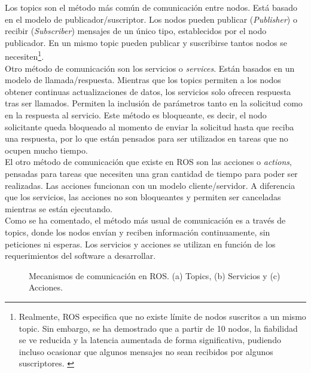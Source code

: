 Los topics son el método más común de comunicación entre nodos. Está basado en el modelo de publicador/suscriptor. Los nodos pueden publicar (\textit{Publisher}) o recibir (\textit{Subscriber}) mensajes de un único tipo, establecidos por el nodo publicador. En un mismo topic pueden publicar y suscribirse tantos nodos se necesiten\footnote{Realmente, ROS especifica que no existe límite de nodos suscritos a un mismo topic. Sin embargo, se ha demostrado que a partir de 10 nodos, la fiabilidad se ve reducida y la latencia aumentada de forma significativa, pudiendo incluso ocasionar que algunos mensajes no sean recibidos por algunos suscriptores. \cite{issue}}. \\

Otro método de comunicación son los servicios o \textit{services}. Están basados en un modelo de llamada/respuesta. Mientras que los topics permiten a los nodos obtener continuas actualizaciones de datos, los servicios solo ofrecen respuesta tras ser llamados. Permiten la inclusión de parámetros tanto en la solicitud como en la respuesta al servicio. Este método es bloqueante, es decir, el nodo solicitante queda bloqueado al momento de enviar la solicitud hasta que reciba una respuesta, por lo que están pensados para ser utilizados en tareas que no ocupen mucho tiempo.\\

El otro método de comunicación que existe en ROS son las acciones o \textit{actions}, pensadas para tareas que necesiten una gran cantidad de tiempo para poder ser realizadas. Las acciones funcionan con un modelo cliente/servidor. A diferencia que los servicios, las acciones no son bloqueantes y permiten ser canceladas mientras se están ejecutando.\\

Como se ha comentado, el método más usual de comunicación es a través de topics, donde los nodos envían y reciben información continuamente, sin peticiones ni esperas. Los servicios y acciones se utilizan en función de los requerimientos del software a desarrollar.\\

\begin{figure}[H]
 \centering
  \hspace{0.5cm}
 \caption{Mecanismos de comunicación en ROS. (a) Topics, (b) Servicios y (c) Acciones.}
 \label{fig:comm}
\end{figure}

